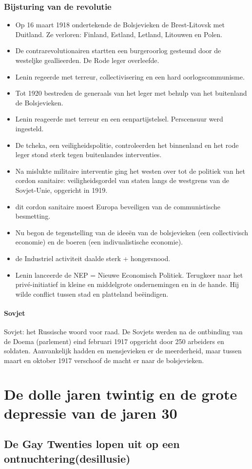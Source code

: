 \documentclass{article}
\begin{document}
\subsubsection{Bijsturing van de revolutie}
\begin{itemize}
    \item Op 16 maart 1918 ondertekende de Bolsjevieken de Brest-Litovsk met Duitland. Ze verloren: Finland, Estland, Letland, Litouwen en Polen.
    \item De contrarevolutionairen startten een burgeroorlog gesteund door de westeljke geallieerden. De Rode leger overleefde.
    \item Lenin regeerde met terreur, collectivisering en een hard oorlogscommunisme.
    \item Tot 1920 bestreden de generaals van het leger met behulp van het buitenland de Bolsjevieken.
    \item Lenin reageerde met terreur en een eenpartijstelsel. Perscensuur werd ingesteld.
    \item De tcheka, een veiligheidspolitie, controleerden het binnenland en het rode leger stond sterk tegen buitenlandes interventies.
    \item Na mislukte militaire interventie ging het westen over tot de politiek van het cordon sanitaire: veiligheidsgordel van staten langs de westgrens van de Sovjet-Unie, opgericht in 1919.
    \item dit cordon sanitaire moest Europa beveiligen van de communistische besmetting.
    \item Nu begon de tegenstelling van de ideeën van de bolsjevieken (een collectivisch economie) en de boeren (een indivualistische economie).
    \item de Industriel activiteit daalde sterk + hongersnood.
    \item Lenin lanceerde de NEP = Nieuwe Economisch Politiek. Terugkeer naar het privé-initiatief in kleine en middelgrote ondernemingen en in de hande. Hij wilde conflict tussen stad en platteland beëindigen.
\end{itemize}
\paragraph{Sovjet}
Sovjet: het Russische woord voor raad. De Sovjets werden na de ontbinding van de Doema (parlement) eind februari 1917 opgericht door 250 arbeiders en soldaten. Aanvankelijk hadden en mensjevieken er de meerderheid, maar tussen maart en oktober 1917 verschoof de macht er naar de bolsjevieken.

\section{De dolle jaren twintig en de grote depressie van de jaren 30}
\subsection{De Gay Twenties lopen uit op een ontnuchtering(desillusie)}
\end{document}
